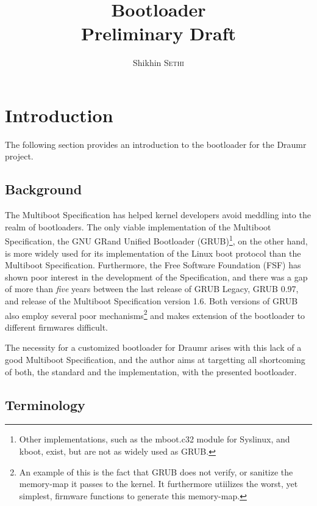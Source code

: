 \documentclass[a4paper,oneside]{memoir}
\begin{document}
\title{Bootloader\\\small Preliminary Draft}
\author{Shikhin \textsc{Sethi}}
\maketitle

\clearpage

\tableofcontents

\chapter{Introduction}

The following section provides an introduction to the bootloader for the Draumr project.

\section{Background}

The Multiboot Specification has helped kernel developers avoid meddling into the realm of bootloaders. The only viable implementation of the Multiboot Specification, the GNU GRand Unified Bootloader (GRUB)\footnote{Other implementations, such as the mboot.c32 module for Syslinux, and kboot, exist, but are not as widely used as GRUB.}, on the other hand, is more widely used for its implementation of the Linux boot protocol than the Multiboot Specification. Furthermore, the Free Software Foundation (FSF) has shown poor interest in the development of the Specification, and there was a gap of more than \emph{five} years between the last release of GRUB Legacy, GRUB 0.97, and release of the Multiboot Specification version 1.6. Both versions of GRUB also employ several poor mechanisms\footnote{An example of this is the fact that GRUB does not verify, or sanitize the memory-map it passes to the kernel. It furthermore utiilizes the worst, yet simplest, firmware functions to generate this memory-map.} and makes extension of the bootloader to different firmwares difficult.

The necessity for a customized bootloader for Draumr arises with this lack of a good Multiboot Specification, and the author aims at targetting all shortcoming of both, the standard and the implementation, with the presented bootloader.

\section{Terminology}
\end{document}
